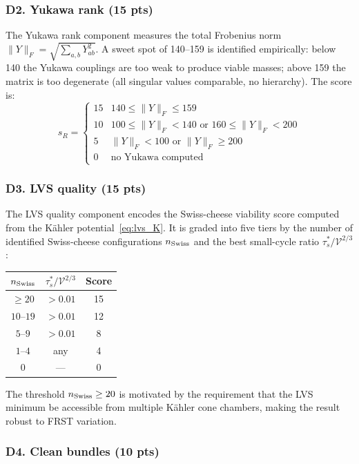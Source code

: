 \documentclass[11pt,a4paper]{article}
\begin{document}
\subsubsection*{D2. Yukawa rank (15 pts)}

The Yukawa rank component measures the total Frobenius norm
$\|Y\|_F = \sqrt{\sum_{a,b} Y_{ab}^2}$.
A sweet spot of 140--159 is identified empirically:
below 140 the Yukawa couplings are too weak to produce
viable masses; above 159 the matrix is too degenerate
(all singular values comparable, no hierarchy).
The score is:
\[
  s_R = \begin{cases}
    15 & 140 \leq \|Y\|_F \leq 159 \\
    10 & 100 \leq \|Y\|_F < 140 \text{ or } 160 \leq \|Y\|_F < 200 \\
    5  & \|Y\|_F < 100 \text{ or } \|Y\|_F \geq 200 \\
    0  & \text{no Yukawa computed}
  \end{cases}
\]

\subsubsection*{D3. LVS quality (15 pts)}

The LVS quality component encodes the Swiss-cheese viability score
computed from the K\"{a}hler potential~\eqref{eq:lvs_K}.
It is graded into five tiers by the number of identified
Swiss-cheese configurations $n_{\rm Swiss}$ and the best
small-cycle ratio $\tau_s^*/\mathcal{V}^{2/3}$:
\begin{center}\small
\begin{tabular}{ccc}
\toprule
$n_{\rm Swiss}$ & $\tau_s^*/\mathcal{V}^{2/3}$ & Score \\
\midrule
$\geq 20$ & $> 0.01$ & 15 \\
$10$--$19$ & $> 0.01$ & 12 \\
$5$--$9$   & $> 0.01$ & 8  \\
$1$--$4$   & any      & 4  \\
$0$        & ---      & 0  \\
\bottomrule
\end{tabular}
\end{center}
The threshold $n_{\rm Swiss} \geq 20$ is motivated by the requirement
that the LVS minimum be accessible from multiple K\"{a}hler cone chambers,
making the result robust to FRST variation.

\subsubsection*{D4. Clean bundles (10 pts)}
\end{document}

